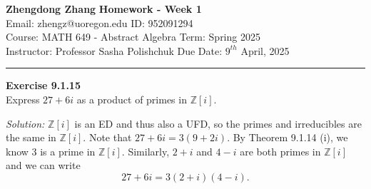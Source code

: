 \documentclass[a4paper, 12pt]{article}
\newenvironment{problem}[2][Exercise]
    { \begin{mdframed}[backgroundcolor=gray!20] \textbf{#1 #2} \\}
    {  \end{mdframed}}
\newenvironment{solution}
    {\textit{Solution:}}
    {}
\begin{document}
\noindent
\large\textbf{Zhengdong Zhang} \hfill \textbf{Homework - Week 1}   \\
Email: zhengz@uoregon.edu \hfill ID: 952091294 \\
\normalsize Course: MATH 649 - Abstract Algebra  \hfill Term: Spring 2025\\
Instructor: Professor Sasha Polishchuk \hfill Due Date: $9^{th}$ April, 2025 \\
\noindent\rule{7in}{2.8pt}
\begin{comment}

\begin{problem}{9.1.5}
An irreducible element in a UFD is prime.
\end{problem}


\noindent\rule{7in}{2.8pt}
	
\end{comment}
\begin{problem}{9.1.15}
Express \(27+6i\) as a product of primes in \(\mathbb{Z}[i]\).
\end{problem}
\begin{solution}
\(\mathbb{Z}[i]\) is an ED and thus also a UFD, so the primes and irreducibles are the same in \(\mathbb{Z}[i]\). Note that \(27+6i=3(9+2i)\). By Theorem 9.1.14 (i), we know \(3\) is a prime in \(\mathbb{Z}[i]\). Similarly, \(2+i\) and \(4-i\) are both primes in \(\mathbb{Z}[i]\) 
and we can write 
\[27+6i=3(2+i)(4-i).\]
\end{solution}
\end{document}
